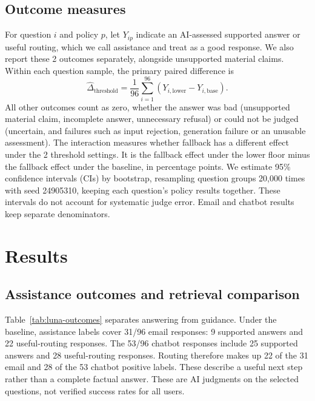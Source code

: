\documentclass[a4paper,10pt,twocolumn]{article}
\begin{document}
\subsection{Outcome measures}
For question $i$ and policy $p$, let $Y_{ip}$ indicate an AI-assessed supported answer or useful routing, which we call assistance and treat as a good response. We also report these 2 outcomes separately, alongside unsupported material claims. Within each question sample, the primary paired difference is
\[
\widehat{\Delta}_{\mathrm{threshold}}=
\frac{1}{96}\sum_{i=1}^{96}(Y_{i,\mathrm{lower}}-Y_{i,\mathrm{base}}).
\]
All other outcomes count as zero, whether the answer was bad (unsupported material claim, incomplete answer, unnecessary refusal) or could not be judged (uncertain, and failures such as input rejection, generation failure or an unusable assessment). The interaction measures whether fallback has a different effect under the 2 threshold settings. It is the fallback effect under the lower floor minus the fallback effect under the baseline, in percentage points. We estimate 95\% confidence intervals (CIs) by bootstrap, resampling question groups 20,000 times with seed 24905310, keeping each question's policy results together. These intervals do not account for systematic judge error. Email and chatbot results keep separate denominators.

\section{Results}
\subsection{Assistance outcomes and retrieval comparison}
Table~\ref{tab:luna-outcomes} separates answering from guidance. Under the baseline, assistance labels cover 31/96 email responses: 9 supported answers and 22 useful-routing responses. The 53/96 chatbot responses include 25 supported answers and 28 useful-routing responses. Routing therefore makes up 22 of the 31 email and 28 of the 53 chatbot positive labels. These describe a useful next step rather than a complete factual answer. These are AI judgments on the selected questions, not verified success rates for all users.
\end{document}
